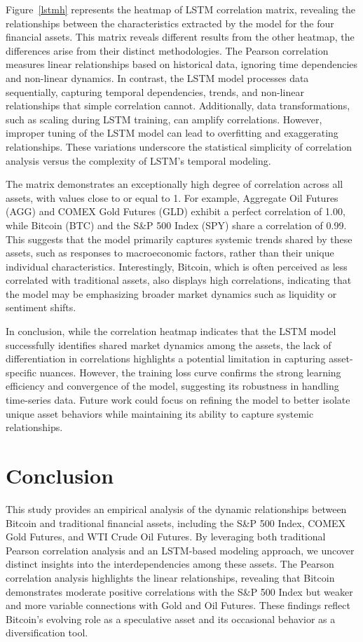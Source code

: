 \documentclass{article}
\begin{document}
Figure~\ref{lstmh} represents the heatmap of LSTM correlation matrix, revealing the relationships between the characteristics extracted by the model for the four financial assets. This matrix reveals different results from the other heatmap, the differences arise from their distinct methodologies. The Pearson correlation measures linear relationships based on historical data, ignoring time dependencies and non-linear dynamics. In contrast, the LSTM model processes data sequentially, capturing temporal dependencies, trends, and non-linear relationships that simple correlation cannot. Additionally, data transformations, such as scaling during LSTM training, can amplify correlations. However, improper tuning of the LSTM model can lead to overfitting and exaggerating relationships. These variations underscore the statistical simplicity of correlation analysis versus the complexity of LSTM’s temporal modeling. 

The matrix demonstrates an exceptionally high degree of correlation across all assets, with values close to or equal to 1. For example, Aggregate Oil Futures (AGG) and COMEX Gold Futures (GLD) exhibit a perfect correlation of 1.00, while Bitcoin (BTC) and the S\&P 500 Index (SPY) share a correlation of 0.99. This suggests that the model primarily captures systemic trends shared by these assets, such as responses to macroeconomic factors, rather than their unique individual characteristics. Interestingly, Bitcoin, which is often perceived as less correlated with traditional assets, also displays high correlations, indicating that the model may be emphasizing broader market dynamics such as liquidity or sentiment shifts.


In conclusion, while the correlation heatmap indicates that the LSTM model successfully identifies shared market dynamics among the assets, the lack of differentiation in correlations highlights a potential limitation in capturing asset-specific nuances. However, the training loss curve confirms the strong learning efficiency and convergence of the model, suggesting its robustness in handling time-series data. Future work could focus on refining the model to better isolate unique asset behaviors while maintaining its ability to capture systemic relationships.

\section{Conclusion}


This study provides an empirical analysis of the dynamic relationships between Bitcoin and traditional financial assets, including the S\&P 500 Index, COMEX Gold Futures, and WTI Crude Oil Futures. By leveraging both traditional Pearson correlation analysis and an LSTM-based modeling approach, we uncover distinct insights into the interdependencies among these assets. The Pearson correlation analysis highlights the linear relationships, revealing that Bitcoin demonstrates moderate positive correlations with the S\&P 500 Index but weaker and more variable connections with Gold and Oil Futures. These findings reflect Bitcoin’s evolving role as a speculative asset and its occasional behavior as a diversification tool.
\end{document}
